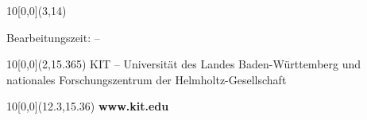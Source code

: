 \begin{titlepage}
  \begin{textblock}{10}[0,0](3,14)
    \begin{center}
      \large{Bearbeitungszeit: \timestart \hspace*{0.25cm} -- \hspace*{0.25cm} \timeend}
    \end{center}
  \end{textblock}

  \begin{textblock}{10}[0,0](2,15.365)
    \tiny{KIT -- Universität des Landes Baden-Württemberg und nationales Forschungszentrum der Helmholtz-Gesellschaft}
  \end{textblock}

  \begin{textblock}{10}[0,0](12.3,15.36)
    \large{
      \textbf{www.kit.edu}
    }
  \end{textblock}
\end{titlepage}
